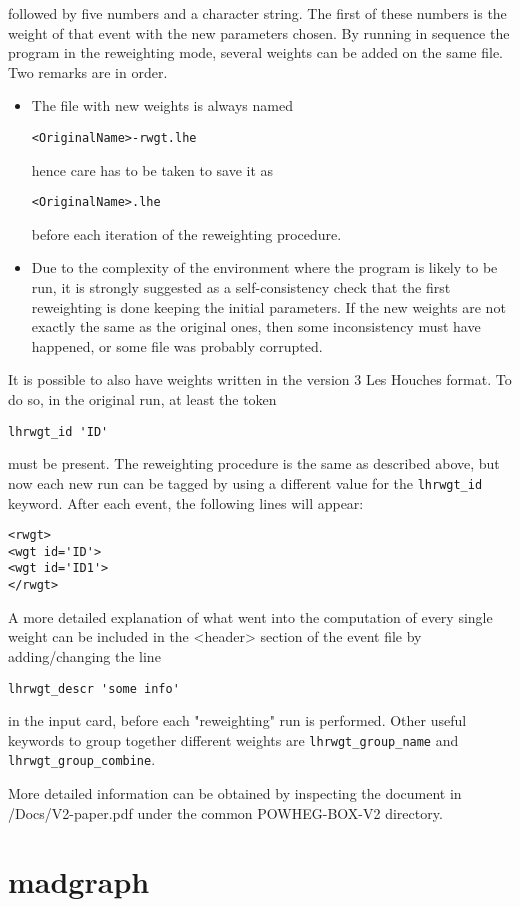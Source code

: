 followed by five numbers and a character string. The first of these 
numbers is the weight of that event with the new parameters chosen. By 
running in sequence the program in the reweighting mode, several 
weights can be added on the same file. Two remarks are in order.

\begin{itemize} 

\item The file with new weights is always named 
\begin{verbatim}
<OriginalName>-rwgt.lhe
\end{verbatim}
hence care has to be taken to save it as 
\begin{verbatim}
<OriginalName>.lhe
\end{verbatim}
before each iteration of the reweighting procedure. 

\item Due to the complexity of the environment where the program is 
likely to be run, it is strongly suggested as a self-consistency check 
that the first reweighting is done keeping the initial parameters. If 
the new weights are not exactly the same as the original ones, then 
some inconsistency must have happened, or some file was probably 
corrupted. 

\end{itemize} 

\noindent It is possible to also have weights written in the version 3 Les Houches format. 
To do so, in the original run, at least the token 

\begin{verbatim}
lhrwgt_id 'ID'
\end{verbatim}
must be present. The reweighting procedure is the same as described 
above, but now each new run can be tagged by using a different value 
for the \texttt{lhrwgt\_id} keyword. After each event, the following lines will 
appear: 

\begin{verbatim}
<rwgt> 
<wgt id='ID'>
<wgt id='ID1'>
</rwgt> 
\end{verbatim}

A more detailed explanation of what went into the computation of every 
single weight can be included in the <header> section of the event 
file by adding/changing the line 

\begin{verbatim}
lhrwgt_descr 'some info'
\end{verbatim}

in the input card, before each "reweighting" run is performed. Other 
useful keywords to group together different weights are 
\texttt{lhrwgt\_group\_name} and \texttt{lhrwgt\_group\_combine}. 

More detailed information can be obtained by inspecting the document in 
{\namecaps /Docs/V2-paper.pdf} under the common {\namecaps POWHEG-BOX-V2} directory. 

\section{madgraph}


